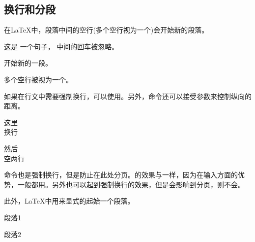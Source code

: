 \subsection{换行和分段}
在\LaTeX 中，段落中间的空行(多个空行视为一个)会开始新的段落。

\begin{texlst}
这是
一个句子，
中间的回车被忽略。

开始新的一段。


多个空行被视为一个。
\end{texlst}

如果在行文中需要强制换行，可以使用\texinline{\\}。另外，\texinline{\\}命令还可以接受参数来控制纵向的距离。

\begin{texlst}
	这里\\换行

	然后\\[2em]空两行
\end{texlst}

\texinline{\\*}命令也是强制换行，但是防止在此处分页。\texinline{\newline}的效果与\texinline{\\}一样，因为\texinline{\\}在输入方面的优势，一般都用\texinline{\\}。另外\texinline{\linebreak}也可以起到强制换行的效果，但是\texinline{\linebreak}会影响到分页，\texinline{\newline}则不会。

此外，\LaTeX 中用\texinline{\par}来显式的起始一个段落。

\begin{texlst}
	段落1\par 段落2
\end{texlst}
